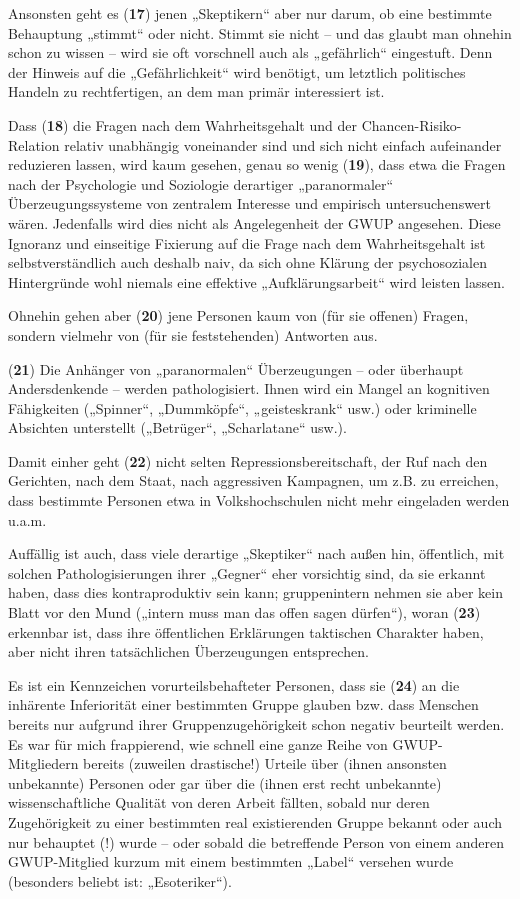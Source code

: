 Ansonsten geht es (\textbf{17}) jenen „Skeptikern`` aber nur darum, ob
eine bestimmte Behauptung „stimmt`` oder nicht. Stimmt sie nicht -- und
das glaubt man ohnehin schon zu wissen -- wird sie oft vorschnell auch
als „gefährlich`` eingestuft. Denn der Hinweis auf die „Gefährlichkeit``
wird benötigt, um letztlich politisches Handeln zu rechtfertigen, an dem
man primär interessiert ist.

Dass (\textbf{18}) die Fragen nach dem Wahrheitsgehalt und der
Chancen-Risiko-Relation relativ unabhängig voneinander sind und sich
nicht einfach aufeinander reduzieren lassen, wird kaum gesehen, genau so
wenig (\textbf{19}), dass etwa die Fragen nach der Psychologie und
Soziologie derartiger „paranormaler`` Überzeugungssysteme von zentralem
Interesse und empirisch untersuchenswert wären. Jedenfalls wird dies
nicht als Angelegenheit der GWUP angesehen. Diese Ignoranz und
einseitige Fixierung auf die Frage nach dem Wahrheitsgehalt ist
selbstverständlich auch deshalb naiv, da sich ohne Klärung der
psychosozialen Hintergründe wohl niemals eine effektive
„Aufklärungsarbeit`` wird leisten lassen.

Ohnehin gehen aber (\textbf{20}) jene Personen kaum von (für sie
offenen) Fragen, sondern vielmehr von (für sie feststehenden) Antworten
aus.

(\textbf{21}) Die Anhänger von „paranormalen`` Überzeugungen -- oder
überhaupt Andersdenkende -- werden pathologisiert. Ihnen wird ein Mangel
an kognitiven Fähigkeiten („Spinner``, „Dummköpfe``, „geisteskrank``
usw.) oder kriminelle Absichten unterstellt („Betrüger``, „Scharlatane``
usw.).

Damit einher geht (\textbf{22}) nicht selten Repressionsbereitschaft,
der Ruf nach den Gerichten, nach dem Staat, nach aggressiven Kampagnen,
um z.B. zu erreichen, dass bestimmte Personen etwa in Volkshochschulen
nicht mehr eingeladen werden u.a.m.

Auffällig ist auch, dass viele derartige „Skeptiker`` nach außen hin,
öffentlich, mit solchen Pathologisierungen ihrer „Gegner`` eher
vorsichtig sind, da sie erkannt haben, dass dies kontraproduktiv sein
kann; gruppenintern nehmen sie aber kein Blatt vor den Mund („intern
muss man das offen sagen dürfen``), woran (\textbf{23}) erkennbar ist,
dass ihre öffentlichen Erklärungen taktischen Charakter haben, aber
nicht ihren tatsächlichen Überzeugungen entsprechen.

Es ist ein Kennzeichen vorurteilsbehafteter Personen, dass sie
(\textbf{24}) an die inhärente Inferiorität einer bestimmten Gruppe
glauben bzw. dass Menschen bereits nur aufgrund ihrer
Gruppenzugehörigkeit schon negativ beurteilt werden. Es war für mich
frappierend, wie schnell eine ganze Reihe von GWUP-Mitgliedern bereits
(zuweilen drastische!) Urteile über (ihnen ansonsten unbekannte)
Personen oder gar über die (ihnen erst recht unbekannte)
wissenschaftliche Qualität von deren Arbeit fällten, sobald nur deren
Zugehörigkeit zu einer bestimmten real existierenden Gruppe bekannt oder
auch nur behauptet (!) wurde -- oder sobald die betreffende Person von
einem anderen GWUP-Mitglied kurzum mit einem bestimmten „Label``
versehen wurde (besonders beliebt ist: „Esoteriker``).

